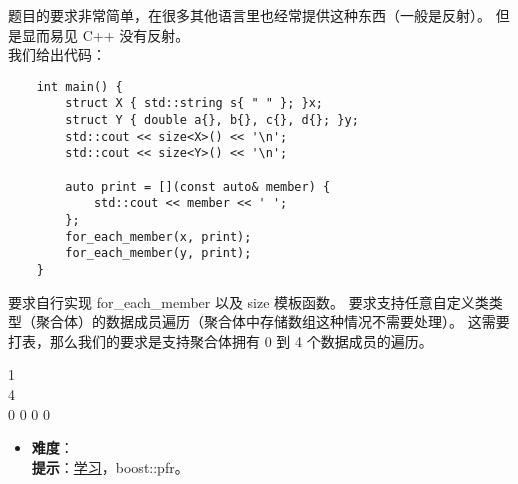 题目的要求非常简单，在很多其他语言里也经常提供这种东西（一般是反射）。 但是显而易见 C++ 没有反射。\\

我们给出代码：

\begin{verbatim}
    int main() {
        struct X { std::string s{ " " }; }x;
        struct Y { double a{}, b{}, c{}, d{}; }y;
        std::cout << size<X>() << '\n';
        std::cout << size<Y>() << '\n';
    
        auto print = [](const auto& member) {
            std::cout << member << ' ';
        };
        for_each_member(x, print);
        for_each_member(y, print);
    }
\end{verbatim}

要求自行实现 for\_each\_member 以及 size 模板函数。 要求支持任意自定义类类型（聚合体）的数据成员遍历（聚合体中存储数组这种情况不需要处理）。 这需要打表，那么我们的要求是支持聚合体拥有 0 到 4 个数据成员的遍历。

\begin{tcolorbox}[title = {要求运行结果},
    fonttitle = \bfseries, fontupper = \sffamily, fontlower = \itshape]
    1           \\
    4           \\
      0 0 0 0           %
\end{tcolorbox}

\begin{itemize}
\item \textbf{难度}：  \\
      \textbf{提示}：\href{https://akrzemi1.wordpress.com/2020/10/01/reflection-for-aggregates/}{学习}，boost::pfr。
\end{itemize}